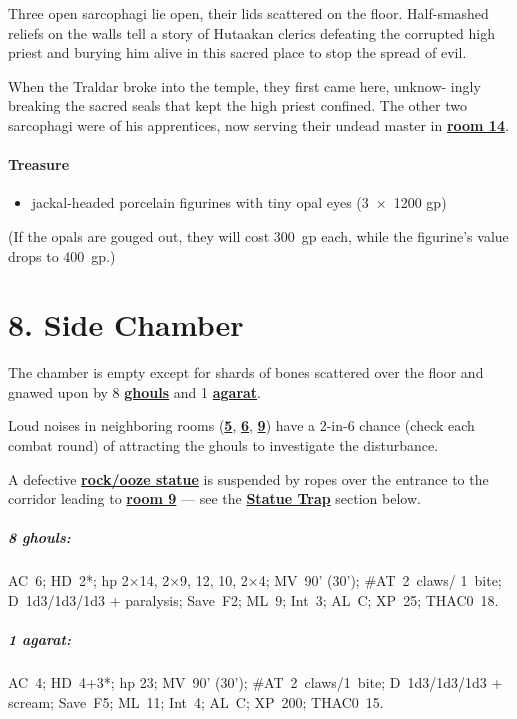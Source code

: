 \documentclass[english,11pt,openany,letterpaper,twocolumn]{book}
\begin{document}
Three open sarcophagi lie open, their lids scattered on the floor. Half-smashed reliefs on the walls tell a story of Hutaakan clerics defeating the corrupted high priest and burying him alive in this sacred place to stop the spread of evil.

\tab When the Traldar broke into the temple, they first came here, unknow- ingly breaking the sacred seals that kept the high priest confined. The other two sarcophagi were of his apprentices, now serving their undead master in \hyperlink{room14}{\textbf{room 14}}.

\skipline
\paragraph{Treasure}
\begin{itemize}[leftmargin=*]
	\item jackal-headed porcelain figurines with tiny opal eyes (3~×~1200 gp)
\end{itemize}

(If the opals are gouged out, they will cost 300~gp each, while the figurine's value drops to 400~gp.)


\hypertarget{room8}{}
\section{8. Side Chamber}

The chamber is empty except for shards of bones scattered over the floor and gnawed upon by 8 \hyperlink{ghoul}{\textbf{ghouls}} and 1 \hyperlink{agarat}{\textbf{agarat}}.

\tab Loud noises in neighboring rooms (\hyperlink{room5}{\textbf{5}}, \hyperlink{room6}{\textbf{6}}, \hyperlink{room9}{\textbf{9}}) have a 2-in-6 chance (check each combat round) of attracting the ghouls to investigate the disturbance.

\tab A defective \hyperlink{statue}{\textbf{rock/ooze statue}} is suspended by ropes over the entrance to the corridor leading to \hyperlink{room9}{\textbf{room 9}} --- see the \hyperlink{statue-trap}{\textbf{Statue Trap}} section below.

\begin{textbox}
	\subparagraph{8 ghouls:} AC~6; HD~2*; hp 2×14, 2×9, 12, 10, 2×4; MV~90' (30'); \#AT~2~claws/ 1~bite; D~1d3/1d3/1d3 + paralysis; Save~F2; ML~9; Int~3; AL~C; XP~25; THAC0~18.
	
	\subparagraph{1 agarat:} AC~4; HD~4+3*; hp 23; MV~90' (30'); \#AT~2~claws/1~bite; D~1d3/1d3/1d3 + scream; Save~F5; ML~11; Int~4; AL~C; XP~200; THAC0~15.
\end{textbox}
\end{document}
